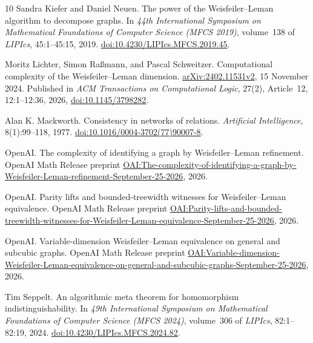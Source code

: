 \begin{thebibliography}{10}
Sandra Kiefer and Daniel Neuen.
\newblock The power of the Weisfeiler--Leman algorithm to decompose graphs.
\newblock In \emph{44th International Symposium on Mathematical Foundations
of Computer Science (MFCS 2019)}, volume~138 of \emph{LIPIcs},
45:1--45:15, 2019.
\newblock \href{https://doi.org/10.4230/LIPIcs.MFCS.2019.45}{doi:10.4230/LIPIcs.MFCS.2019.45}.

Moritz Lichter, Simon Ra{\ss}mann, and Pascal Schweitzer.
\newblock Computational complexity of the Weisfeiler--Leman dimension.
\newblock \href{https://arxiv.org/abs/2402.11531v2}{arXiv:2402.11531v2},
15 November 2024.
\newblock Published in \emph{ACM Transactions on Computational Logic},
27(2), Article~12, 12:1--12:36, 2026,
\href{https://doi.org/10.1145/3798282}{doi:10.1145/3798282}.

Alan K. Mackworth.
\newblock Consistency in networks of relations.
\newblock \emph{Artificial Intelligence}, 8(1):99--118, 1977.
\newblock \href{https://doi.org/10.1016/0004-3702(77)90007-8}{doi:10.1016/0004-3702(77)90007-8}.

OpenAI.
\newblock The complexity of identifying a graph by Weisfeiler--Leman refinement.
\newblock OpenAI Math Release preprint
\href{https://github.com/openai/math/blob/main/preprints/The-complexity-of-identifying-a-graph-by-Weisfeiler-Leman-refinement-September-25-2026/paper.pdf}{OAI:The-complexity-of-identifying-a-graph-by-Weisfeiler-Leman-refinement-September-25-2026}, 2026.

OpenAI.
\newblock Parity lifts and bounded-treewidth witnesses for Weisfeiler--Leman equivalence.
\newblock OpenAI Math Release preprint
\href{https://github.com/openai/math/blob/main/preprints/Parity-lifts-and-bounded-treewidth-witnesses-for-Weisfeiler-Leman-equivalence-September-25-2026/paper.pdf}{OAI:Parity-lifts-and-bounded-treewidth-witnesses-for-Weisfeiler-Leman-equivalence-September-25-2026}, 2026.

OpenAI.
\newblock Variable-dimension Weisfeiler--Leman equivalence on general and subcubic graphs.
\newblock OpenAI Math Release preprint
\href{https://github.com/openai/math/blob/main/preprints/Variable-dimension-Weisfeiler-Leman-equivalence-on-general-and-subcubic-graphs-September-25-2026/paper.pdf}{OAI:Variable-dimension-Weisfeiler-Leman-equivalence-on-general-and-subcubic-graphs-September-25-2026}, 2026.

Tim Seppelt.
\newblock An algorithmic meta theorem for homomorphism indistinguishability.
\newblock In \emph{49th International Symposium on Mathematical Foundations
of Computer Science (MFCS 2024)}, volume~306 of \emph{LIPIcs},
82:1--82:19, 2024.
\newblock \href{https://doi.org/10.4230/LIPIcs.MFCS.2024.82}{doi:10.4230/LIPIcs.MFCS.2024.82}.


\end{thebibliography}
